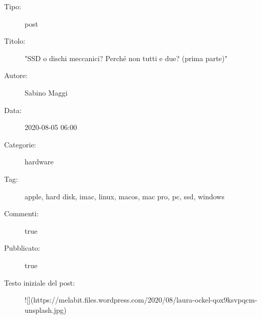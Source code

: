 \documentclass[11pt,oneside,a4paper]{report}
\begin{document}
\begin{framed}
\begin{description}
    \item[Tipo:] post
    \item[Titolo:] "SSD o dischi meccanici? Perché non tutti e due? (prima parte)"
    \item[Autore:] Sabino Maggi
    \item[Data:] 2020-08-05 06:00
    \item[Categorie:] hardware
    \item[Tag:] apple, hard disk, imac, linux, macos, mac pro, pc, ssd, windows
    \item[Commenti:] true
    \item[Pubblicato:] true
    \item[Testo iniziale del post:] 
    ![](https://melabit.files.wordpress.com/2020/08/laura-ockel-qox9ksvpqcm-unsplash.jpg)
\end{description}
\end{framed}
\end{document}
